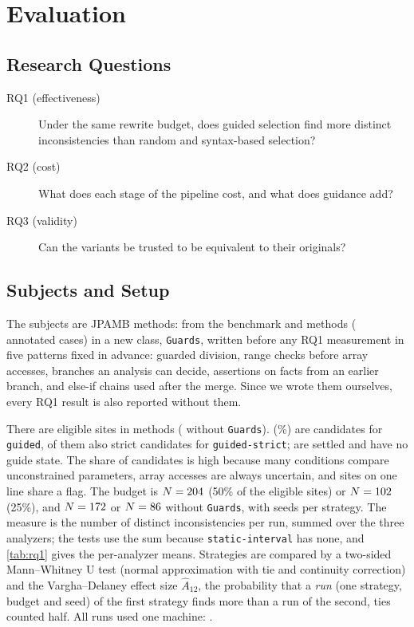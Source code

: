 \section{Evaluation}
\label{sec:evaluation}

\subsection{Research Questions}
\label{sec:rqs}
\begin{description}
  \item[RQ1 (effectiveness)] Under the same rewrite budget, does guided
    selection find more distinct inconsistencies than random and
    syntax-based selection?
  \item[RQ2 (cost)] What does each stage of the pipeline cost, and what does
    guidance add?
  \item[RQ3 (validity)] Can the variants be trusted to be equivalent to their
    originals?
\end{description}

\subsection{Subjects and Setup}
\label{sec:setup}
The subjects are \NumMethods{} JPAMB methods: \NumMethodsOrig{} from the
benchmark and \NumGuardsMethods{} methods (\NumGuardsCases{} annotated cases)
in a new class, \texttt{Guards}, written before any RQ1 measurement in five
patterns fixed in advance: guarded division, range checks before array
accesses, branches an analysis can decide, assertions on facts from an earlier
branch, and else-if chains used after the merge. Since we wrote them
ourselves, every RQ1 result is also reported without them.

There are \NumSites{} eligible sites in \NumSiteMethods{} methods
(\NumSitesNoGuards{} without \texttt{Guards}). \NumUncertain{}
(\UncertainPercent\%) are candidates for \texttt{guided}, \NumStrict{} of them
also strict candidates for \texttt{guided-strict}; \NumSettled{} are settled and \NumNoState{} have no
guide state. The share of candidates is high because many conditions compare
unconstrained parameters, array accesses are always uncertain, and sites on one
line share a flag. The budget is $N=204$ (50\% of the eligible sites)
or $N=102$ (25\%), and $N=172$ or
$N=86$ without \texttt{Guards}, with \NumSeeds{} seeds per
strategy. The measure is the number of distinct inconsistencies per run,
summed over the three analyzers; the tests use the sum because
\texttt{static-interval} has none, and \cref{tab:rq1} gives the per-analyzer
means. Strategies are compared by a two-sided Mann--Whitney U test (normal
approximation with tie and continuity correction) and the Vargha--Delaney effect size
$\hat{A}_{12}$, the probability that a \emph{run} (one strategy, budget and
seed) of the first strategy finds more
than a run of the second, ties counted half. All runs used one machine:
\Machine.

